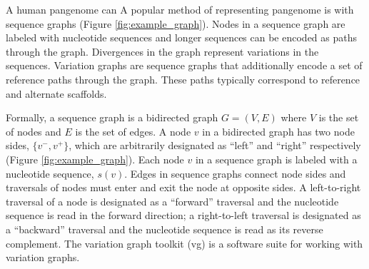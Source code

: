 \documentclass[11pt]{ucscthesis}
\begin{document}
A human pangenome can 
A popular method of representing pangenome is with sequence graphs (Figure \ref{fig:example_graph}).
Nodes in a sequence graph are labeled with nucleotide sequences and longer sequences can be encoded as paths through the graph.
Divergences in the graph represent variations in the sequences.
Variation graphs are sequence graphs that additionally encode a set of reference paths through the graph.
These paths typically correspond to reference and alternate scaffolds.

Formally, a sequence graph is a bidirected graph $G = (V, E)$ where $V$ is the set of nodes and $E$ is the set of edges.
A node $v$ in a bidirected graph has two node sides, $\{v^{-}, v^{+}\}$, which are arbitrarily designated as ``left'' and ``right'' respectively (Figure \ref{fig:example_graph}).
Each node $v$ in a sequence graph is labeled with a nucleotide sequence, $s(v)$.
Edges in sequence graphs connect node sides and traversals of nodes must enter and exit the node at opposite sides.
A left-to-right traversal of a node is designated as a ``forward'' traversal and the nucleotide sequence is read in the forward direction; a right-to-left traversal is designated as a ``backward'' traversal and the nucleotide sequence is read as its reverse complement.
The variation graph toolkit (vg) is a software suite for working with variation graphs.
\end{document}
